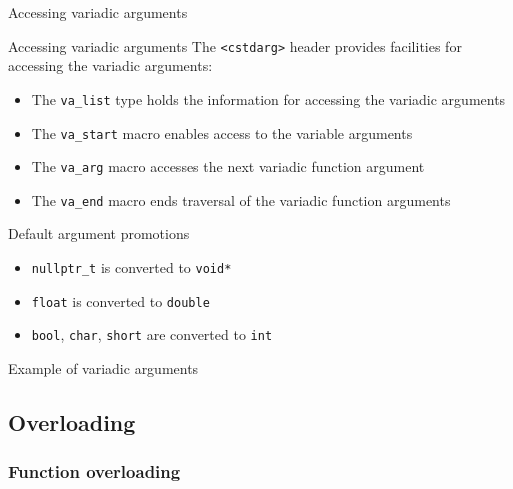 \begin{frame}{Accessing variadic arguments}{}
  \begin{block}{Accessing variadic arguments}
    The \lstinline!<cstdarg>! header provides facilities for accessing the variadic arguments:
    \begin{itemize}
    \item
      The \lstinline!va_list! type holds the information for accessing the variadic arguments
    \item
      The \lstinline!va_start! macro enables access to the variable arguments
    \item
      The \lstinline!va_arg! macro accesses the next variadic function argument
    \item
      The \lstinline!va_end! macro ends traversal of the variadic function arguments
    \end{itemize}
  \end{block}

  \begin{block}{Default argument promotions}
    \begin{itemize}
    \item
      \lstinline!nullptr_t! is converted to \lstinline!void*!
    \item
      \lstinline!float! is converted to \lstinline!double!
    \item
      \lstinline!bool!, \lstinline!char!, \lstinline!short! are converted to \lstinline!int!
    \end{itemize}
  \end{block}
\end{frame}


\begin{frame}{Example of variadic arguments}{}
  \begin{example}
  \end{example}
\end{frame}

\subsection{Overloading}

\subsubsection{Function overloading}

